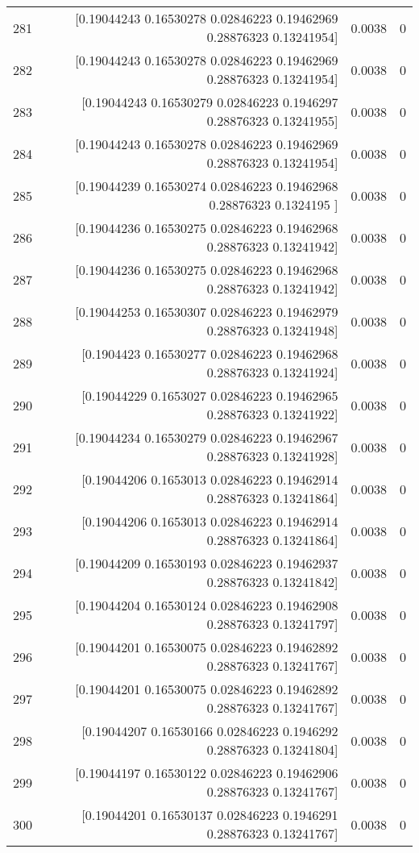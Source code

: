 \begin{longtable}{lrrr}
281 & [0.19044243 0.16530278 0.02846223 0.19462969 0.28876323 0.13241954] & 0.0038 & 0 \\
282 & [0.19044243 0.16530278 0.02846223 0.19462969 0.28876323 0.13241954] & 0.0038 & 0 \\
283 & [0.19044243 0.16530279 0.02846223 0.1946297  0.28876323 0.13241955] & 0.0038 & 0 \\
284 & [0.19044243 0.16530278 0.02846223 0.19462969 0.28876323 0.13241954] & 0.0038 & 0 \\
285 & [0.19044239 0.16530274 0.02846223 0.19462968 0.28876323 0.1324195 ] & 0.0038 & 0 \\
286 & [0.19044236 0.16530275 0.02846223 0.19462968 0.28876323 0.13241942] & 0.0038 & 0 \\
287 & [0.19044236 0.16530275 0.02846223 0.19462968 0.28876323 0.13241942] & 0.0038 & 0 \\
288 & [0.19044253 0.16530307 0.02846223 0.19462979 0.28876323 0.13241948] & 0.0038 & 0 \\
289 & [0.1904423  0.16530277 0.02846223 0.19462968 0.28876323 0.13241924] & 0.0038 & 0 \\
290 & [0.19044229 0.1653027  0.02846223 0.19462965 0.28876323 0.13241922] & 0.0038 & 0 \\
291 & [0.19044234 0.16530279 0.02846223 0.19462967 0.28876323 0.13241928] & 0.0038 & 0 \\
292 & [0.19044206 0.1653013  0.02846223 0.19462914 0.28876323 0.13241864] & 0.0038 & 0 \\
293 & [0.19044206 0.1653013  0.02846223 0.19462914 0.28876323 0.13241864] & 0.0038 & 0 \\
294 & [0.19044209 0.16530193 0.02846223 0.19462937 0.28876323 0.13241842] & 0.0038 & 0 \\
295 & [0.19044204 0.16530124 0.02846223 0.19462908 0.28876323 0.13241797] & 0.0038 & 0 \\
296 & [0.19044201 0.16530075 0.02846223 0.19462892 0.28876323 0.13241767] & 0.0038 & 0 \\
297 & [0.19044201 0.16530075 0.02846223 0.19462892 0.28876323 0.13241767] & 0.0038 & 0 \\
298 & [0.19044207 0.16530166 0.02846223 0.1946292  0.28876323 0.13241804] & 0.0038 & 0 \\
299 & [0.19044197 0.16530122 0.02846223 0.19462906 0.28876323 0.13241767] & 0.0038 & 0 \\
300 & [0.19044201 0.16530137 0.02846223 0.1946291  0.28876323 0.13241767] & 0.0038 & 0 \\

\end{longtable}
